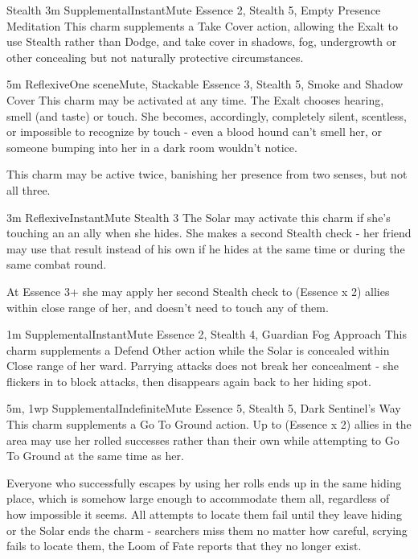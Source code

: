 \begin{Ability}{Stealth}
  {3m}
  {Supplemental}{Instant}{Mute}
  {Essence 2, Stealth 5, Empty Presence Meditation}
  This charm supplements a Take Cover action, allowing the Exalt to use Stealth rather than Dodge, and take cover in shadows, fog, undergrowth or other concealing but not naturally protective circumstances.

  {5m}
  {Reflexive}{One scene}{Mute, Stackable}
  {Essence 3, Stealth 5, Smoke and Shadow Cover}
  This charm may be activated at any time. The Exalt chooses hearing, smell (and taste) or touch. She becomes, accordingly, completely silent, scentless, or impossible to recognize by touch - even a blood hound can't smell her, or someone bumping into her in a dark room wouldn't notice.

  This charm may be active twice, banishing her presence from two senses, but not all three.

  {3m}
  {Reflexive}{Instant}{Mute}
  {Stealth 3}
  The Solar may activate this charm if she's touching an an ally when she hides. She makes a second Stealth check - her friend may use that result instead of his own if he hides at the same time or during the same combat round.

  At Essence 3+ she may apply her second Stealth check to (Essence x 2) allies within close range of her, and doesn't need to touch any of them.

  {1m}
  {Supplemental}{Instant}{Mute}
  {Essence 2, Stealth 4, Guardian Fog Approach}
  This charm supplements a Defend Other action while the Solar is concealed within Close range of her ward. Parrying attacks does not break her concealment - she flickers in to block attacks, then disappears again back to her hiding spot.

  {5m, 1wp}
  {Supplemental}{Indefinite}{Mute}
  {Essence 5, Stealth 5, Dark Sentinel's Way}
  This charm supplements a Go To Ground action. Up to (Essence x 2) allies in the area may use her rolled successes rather than their own while attempting to Go To Ground at the same time as her.

  Everyone who successfully escapes by using her rolls ends up in the same hiding place, which is somehow large enough to accommodate them all, regardless of how impossible it seems. All attempts to locate them fail until they leave hiding or the Solar ends the charm - searchers miss them no matter how careful, scrying fails to locate them, the Loom of Fate reports that they no longer exist.

\end{Ability}

